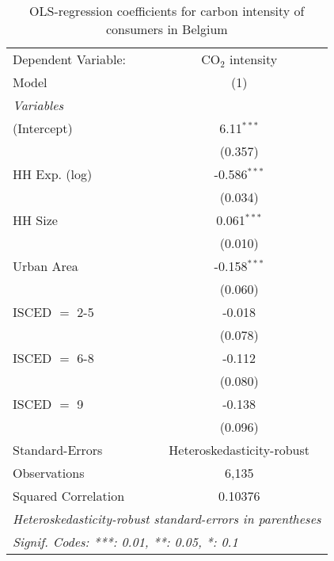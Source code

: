 
\begin{table}[htbp!]
   \centering
   \small
   \begin{adjustbox}{width = 1\textwidth, max height = 0.95\textheight, center}
      \begin{threeparttable}[b]
         \caption{\label{tab:OLS_1_BEL} OLS-regression coefficients for carbon intensity of consumers in Belgium}
         \begin{tabular}{lc}
            \tabularnewline \midrule \midrule
            Dependent Variable: & CO$_{2}$ intensity\\  
            Model               & (1)\\  
            \midrule
            \emph{Variables}\\
            (Intercept)         & 6.11$^{***}$\\   
                                & (0.357)\\   
            HH Exp. (log)       & -0.586$^{***}$\\   
                                & (0.034)\\   
            HH Size             & 0.061$^{***}$\\   
                                & (0.010)\\   
            Urban Area          & -0.158$^{***}$\\   
                                & (0.060)\\   
            ISCED $=$ 2-5       & -0.018\\   
                                & (0.078)\\   
            ISCED $=$ 6-8       & -0.112\\   
                                & (0.080)\\   
            ISCED $=$ 9         & -0.138\\   
                                & (0.096)\\   
            \midrule 
            Standard-Errors     & Heteroskedasticity-robust \\   
            Observations        & 6,135\\  
            Squared Correlation & 0.10376\\  
            \midrule \midrule
            \multicolumn{2}{l}{\emph{Heteroskedasticity-robust standard-errors in parentheses}}\\
            \multicolumn{2}{l}{\emph{Signif. Codes: ***: 0.01, **: 0.05, *: 0.1}}\\
         \end{tabular}
         

\end{threeparttable}
\end{adjustbox}
\end{table}
